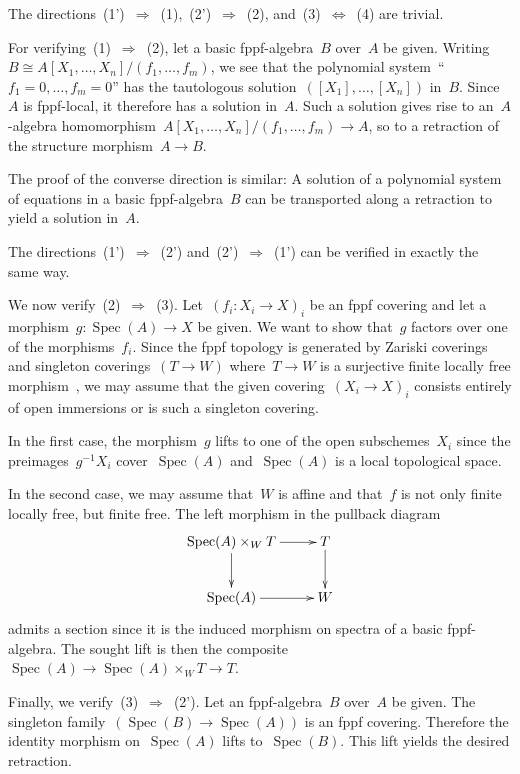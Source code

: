 \documentclass[10pt,reqno,a4paper]{amsbook}
\makeatletter
\theoremstyle{definition}
\theoremstyle{plain}
\theoremstyle{remark}
\DeclareMathOperator{\Spec}{Spec}
\newcommand{\?}{\,{:}\,}
\renewcommand{\_}{\mathpunct{.}\,}
\newcommand{\stacksproject}[1]{\cite[{\href{http://stacks.math.columbia.edu/tag/#1}{Tag~#1}}]{stacks-project}}
\renewenvironment{proof}[1][\proofname]{\par
  \pushQED{\qed}%
  \normalfont \topsep6\p@\@plus6\p@\relax
  \trivlist
  \item[\hskip\labelsep
        \itshape
    #1\@addpunct{.}]\ignorespaces
}{%
  \popQED\endtrivlist\@endpefalse
}
\makeatother
\begin{document}
\begin{proof}The directions~(1')~$\Rightarrow$~(1),~(2')~$\Rightarrow$~(2),
and~(3)~$\Leftrightarrow$~(4) are trivial.

For verifying~(1)~$\Rightarrow$~(2), let a basic fppf-algebra~$B$ over~$A$ be
given. Writing~$B \cong A[X_1,\ldots,X_n]/(f_1,\ldots,f_m)$, we see that the
polynomial system~``$f_1 = 0, \ldots, f_m = 0$'' has the tautologous
solution~$([X_1],\ldots,[X_n])$ in~$B$. Since~$A$ is fppf-local, it therefore
has a solution in~$A$. Such a solution gives rise to an~$A$-algebra
homomorphism~$A[X_1,\ldots,X_n]/(f_1,\ldots,f_m) \to A$, so to a retraction of
the structure morphism~$A \to B$.

The proof of the converse direction is similar: A solution of a polynomial
system of equations in a basic fppf-algebra~$B$ can be transported along a
retraction to yield a solution in~$A$.

The directions~(1')~$\Rightarrow$~(2') and~(2')~$\Rightarrow$~(1') can be
verified in exactly the same way.

We now verify~(2)~$\Rightarrow$~(3). Let~$(f_i : X_i \to X)_i$ be an fppf
covering and let a morphism~$g : \Spec(A) \to X$ be given. We want to show
that~$g$ factors over one of the morphisms~$f_i$. Since the fppf topology is
generated by Zariski coverings and singleton coverings~$(T \to W)$ where~$T \to
W$ is a surjective finite locally free morphism~\stacksproject{05WN}, we may
assume that the given covering~$(X_i \to X)_i$ consists entirely of open
immersions or is such a singleton covering.

In the first case, the morphism~$g$ lifts to one of the open subschemes~$X_i$
since the preimages~$g^{-1}X_i$ cover~$\Spec(A)$ and~$\Spec(A)$ is a local
topological space.

In the second case, we may assume that~$W$ is affine and that~$f$ is not only
finite locally free, but finite free. The left morphism in the pullback diagram
\[ \xymatrix{
  \Spec(A) \times_W T \ar[r]\ar[d] & T \ar[d] \\
  \Spec(A) \ar[r] & W
} \]
admits a section since it is the induced morphism on spectra of a basic
fppf-algebra. The sought lift is then the composite~$\Spec(A) \to \Spec(A)
\times_W T \to T$.

Finally, we verify~(3)~$\Rightarrow$~(2'). Let an fppf-algebra~$B$ over~$A$ be
given. The singleton family~$(\Spec(B) \to \Spec(A))$ is an fppf covering.
Therefore the identity morphism on~$\Spec(A)$ lifts to~$\Spec(B)$. This lift
yields the desired retraction.
\end{proof}
\end{document}
